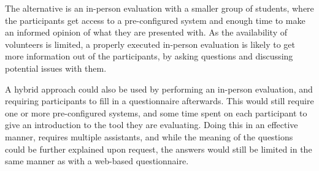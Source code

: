 The alternative is an in-person evaluation with a smaller group of students, where the participants get access to a pre-configured system and enough time to make an informed opinion of what they are presented with.
As the availability of volunteers is limited, a properly executed in-person evaluation is likely to get more information out of the participants, by asking questions and discussing potential issues with them.

A hybrid approach could also be used by performing an in-person evaluation, and requiring participants to fill in a questionnaire afterwards.
This would still require one or more pre-configured systems, and some time spent on each participant to give an introduction to the tool they are evaluating.
Doing this in an effective manner, requires multiple assistants, and while the meaning of the questions could be further explained upon request, the answers would still be limited in the same manner as with a web-based questionnaire.


